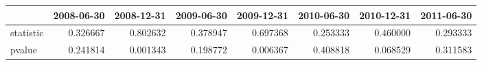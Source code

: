 \begin{tabular}{lrrrrrrr}
\toprule
{} &  2008-06-30 &  2008-12-31 &  2009-06-30 &  2009-12-31 &  2010-06-30 &  2010-12-31 &  2011-06-30 \\
\midrule
statistic &    0.326667 &    0.802632 &    0.378947 &    0.697368 &    0.253333 &    0.460000 &    0.293333 \\
pvalue    &    0.241814 &    0.001343 &    0.198772 &    0.006367 &    0.408818 &    0.068529 &    0.311583 \\
\bottomrule
\end{tabular}
